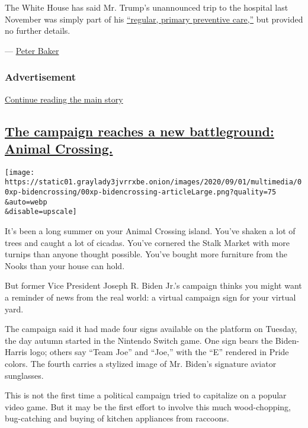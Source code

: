 The White House has said Mr. Trump's unannounced trip to the hospital
last November was simply part of his
\href{https://www.nytimes3xbfgragh.onion/2019/11/18/us/politics/trump-health-emergency.html}{``regular,
primary preventive care,''} but provided no further details.

--- \href{https://www.nytimes3xbfgragh.onion/by/peter-baker}{Peter
Baker}

\hypertarget{advertisement-4}{%
\subsubsection{Advertisement}\label{advertisement-4}}

\protect\hyperlink{after-dfp-ad-mid5}{Continue reading the main story}

\hypertarget{the-campaign-reaches-a-new-battleground-animal-crossing}{%
\subsection{\texorpdfstring{\protect\hyperlink{the-campaign-reaches-a-new-battleground-animal-crossing}{The
campaign reaches a new battleground: Animal
Crossing.}}{The campaign reaches a new battleground: Animal Crossing.}}\label{the-campaign-reaches-a-new-battleground-animal-crossing}}

\texttt{[image: https://static01.graylady3jvrrxbe.onion/images/2020/09/01/multimedia/00xp-bidencrossing/00xp-bidencrossing-articleLarge.png?quality=75\\\&auto=webp\\\&disable=upscale]}

It's been a long summer on your Animal Crossing island. You've shaken a
lot of trees and caught a lot of cicadas. You've cornered the Stalk
Market with more turnips than anyone thought possible. You've bought
more furniture from the Nooks than your house can hold.

But former Vice President Joseph R. Biden Jr.'s campaign thinks you
might want a reminder of news from the real world: a virtual campaign
sign for your virtual yard.

The campaign said it had made four signs available on the platform on
Tuesday, the day autumn started in the Nintendo Switch game. One sign
bears the Biden-Harris logo; others say ``Team Joe'' and ``Joe,'' with
the ``E'' rendered in Pride colors. The fourth carries a stylized image
of Mr. Biden's signature aviator sunglasses.

This is not the first time a political campaign tried to capitalize on a
popular video game. But it may be the first effort to involve this much
wood-chopping, bug-catching and buying of kitchen appliances from
raccoons.

